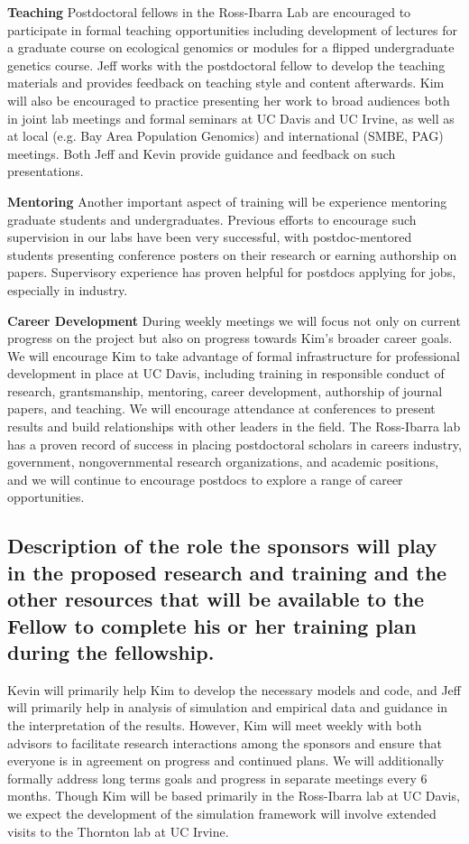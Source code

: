 \textbf{Teaching}  Postdoctoral fellows in the Ross-Ibarra Lab are encouraged to participate in formal teaching opportunities including development of lectures for a graduate course on ecological genomics or modules for a flipped undergraduate genetics course.  Jeff works with the postdoctoral fellow to develop the teaching materials and provides feedback on teaching style and content afterwards. Kim will also be encouraged to practice presenting her work to broad audiences both in joint lab meetings and formal seminars at UC Davis and UC Irvine, as well as at local (e.g. Bay Area Population Genomics) and international (SMBE, PAG) meetings. Both Jeff and Kevin provide guidance and feedback on such presentations.

\textbf{Mentoring}
Another important aspect of training will be experience mentoring graduate students and undergraduates.  Previous efforts to encourage such supervision in our labs have been very successful, with postdoc-mentored students presenting conference posters on their research or earning authorship on papers.  Supervisory experience has proven helpful for postdocs applying for jobs, especially in industry.

\textbf{Career Development}
During weekly  meetings we will focus not only on current progress on the project but also on progress  towards Kim's broader career goals. We will encourage Kim to take advantage of formal infrastructure for professional development in place at UC Davis, including training in responsible conduct of research, grantsmanship, mentoring, career development, authorship of journal papers, and teaching. We will encourage attendance at conferences to present results and build relationships with other leaders in the field. The Ross-Ibarra lab has a proven record of success in placing postdoctoral scholars in careers industry, government, nongovernmental research organizations, and academic positions, and we will continue to encourage postdocs to explore a range of career opportunities.


\subsection{Description of the role the sponsors will play in the proposed research and training and the other resources that will be available to the Fellow to complete his or her training plan during the fellowship.}

Kevin will primarily help Kim to develop the necessary models and code, and Jeff will primarily help in analysis of simulation and empirical data and guidance in the interpretation of the results. 
However, Kim will meet weekly with both advisors to facilitate research interactions among the sponsors and ensure that everyone is in agreement on progress and continued plans.   We will additionally formally address long terms goals and progress in separate meetings every 6 months. Though Kim will be based primarily in the Ross-Ibarra lab at UC Davis, we expect the development of the simulation framework will involve extended visits to the Thornton lab at UC Irvine.


